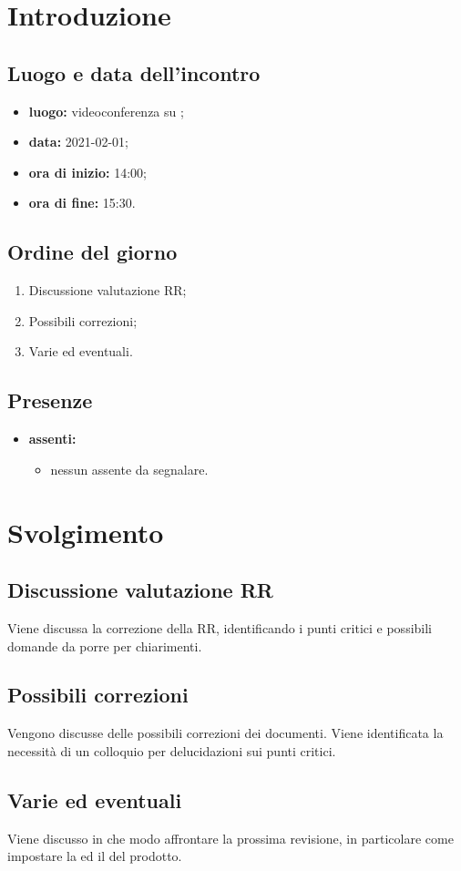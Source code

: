 \section*{Introduzione}
\subsection*{Luogo e data dell'incontro}
\begin{itemize}
	\item \textbf{luogo:} videoconferenza su ;
	\item \textbf{data:} 2021-02-01;
	\item \textbf{ora di inizio:} 14:00;
	\item \textbf{ora di fine:} 15:30.
\end{itemize}

\subsection*{Ordine del giorno}
\begin{enumerate}
	\item Discussione valutazione RR;
	\item Possibili correzioni;
	\item Varie ed eventuali.
\end{enumerate}

\subsection*{Presenze}
\begin{itemize}
	\item \textbf{assenti:}
	\begin{itemize}
		\item nessun assente da segnalare.
	\end{itemize}
\end{itemize}

\section*{Svolgimento}
\subsection*{Discussione valutazione RR}
Viene discussa la correzione della RR, identificando i punti critici e possibili domande da porre per chiarimenti.
\subsection*{Possibili correzioni}
Vengono discusse delle possibili correzioni dei documenti. Viene identificata la necessità di un colloquio per delucidazioni sui punti critici.
\subsection*{Varie ed eventuali}
Viene discusso in che modo affrontare la prossima revisione, in particolare come impostare la  ed il  del prodotto.
